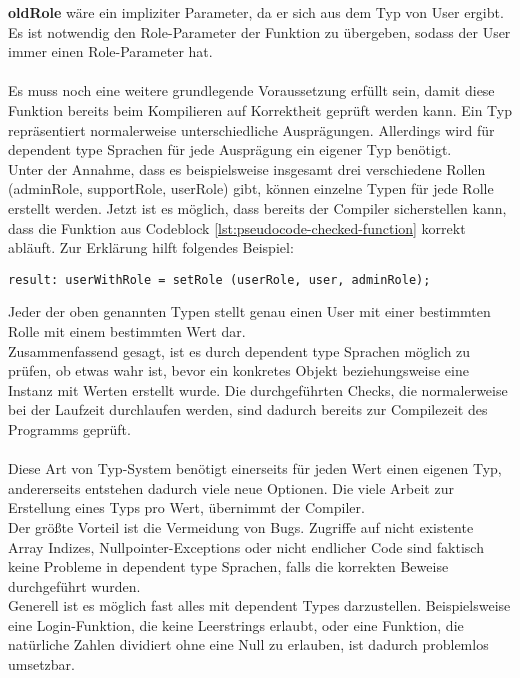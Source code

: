 \textbf{oldRole} wäre ein impliziter Parameter, da er sich aus dem Typ von User ergibt. Es ist notwendig den Role-Parameter der Funktion zu übergeben, sodass der User immer einen Role-Parameter hat.\\
\\
Es muss noch eine weitere grundlegende Voraussetzung erfüllt sein, damit diese Funktion bereits beim Kompilieren auf Korrektheit geprüft werden kann. Ein Typ repräsentiert normalerweise unterschiedliche Ausprägungen. Allerdings wird für dependent type Sprachen für jede Ausprägung ein eigener Typ benötigt.\\
Unter der Annahme, dass es beispielsweise insgesamt drei verschiedene Rollen (adminRole, supportRole, userRole) gibt, können einzelne Typen für jede Rolle erstellt werden.
Jetzt ist es möglich, dass bereits der Compiler sicherstellen kann, dass die Funktion aus Codeblock \ref{lst:pseudocode-checked-function} korrekt abläuft. Zur Erklärung hilft folgendes Beispiel:
\begin{lstlisting}[language=coq,firstnumber=1,caption=Pseudocode Check auf null des User Objektes,label=lst:pseudocode-checked-function-usage]
result: userWithRole = setRole (userRole, user, adminRole);
\end{lstlisting}
Jeder der oben genannten Typen stellt genau einen User mit einer bestimmten Rolle mit einem bestimmten Wert dar.\\
Zusammenfassend gesagt, ist es durch dependent type Sprachen möglich zu prüfen, ob etwas wahr ist, bevor ein konkretes Objekt beziehungsweise eine Instanz mit Werten erstellt wurde. Die durchgeführten Checks, die normalerweise bei der Laufzeit durchlaufen werden, sind dadurch bereits zur Compilezeit des Programms geprüft.\cite{MARTIN01:FV}\\
\\
Diese Art von Typ-System benötigt einerseits für jeden Wert einen eigenen Typ, andererseits entstehen dadurch viele neue Optionen. Die viele Arbeit zur Erstellung eines Typs pro Wert, übernimmt der Compiler.\\
Der größte Vorteil ist die Vermeidung von Bugs. Zugriffe auf nicht existente Array Indizes, Nullpointer-Exceptions oder nicht endlicher Code sind faktisch keine Probleme in dependent type Sprachen, falls die korrekten Beweise durchgeführt wurden.\\
Generell ist es möglich fast alles mit dependent Types darzustellen. Beispielsweise eine Login-Funktion, die keine Leerstrings erlaubt, oder eine Funktion, die natürliche Zahlen dividiert ohne eine Null zu erlauben, ist dadurch problemlos umsetzbar.
